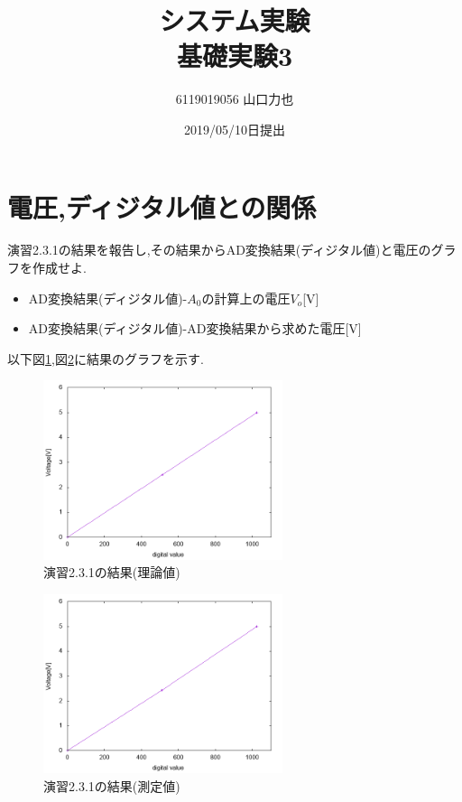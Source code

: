 \documentclass{jarticle}
\title{{システム実験}\\基礎実験3}
\author{6119019056 山口力也}
\date{2019/05/10日提出}
\begin{document}
\maketitle
\section{電圧,ディジタル値との関係}
演習2.3.1の結果を報告し,その結果からAD変換結果(ディジタル値)と電圧のグラフを作成せよ.

\begin{itemize}

\item AD変換結果(ディジタル値)-$A_0$の計算上の電圧$V_o$[V]
\item AD変換結果(ディジタル値)-AD変換結果から求めた電圧[V]

\end{itemize}

以下図\ref{fig:enshu2-3-1riron},図\ref{fig:enshu2-3-1sokutei}に結果のグラフを示す.

\begin{figure}[H]
\begin{center}
\includegraphics[width=7.0cm]{images/enshu2-3-1_riron.png}
\caption{演習2.3.1の結果(理論値)}
\label{fig:enshu2-3-1riron}
\end{center}
\end{figure}

\begin{figure}[H]
\begin{center}
\includegraphics[width=7.0cm]{images/enshu2-3-1_sokutei.png}
\caption{演習2.3.1の結果(測定値)}
\label{fig:enshu2-3-1sokutei}
\end{center}
\end{figure}
\end{document}
